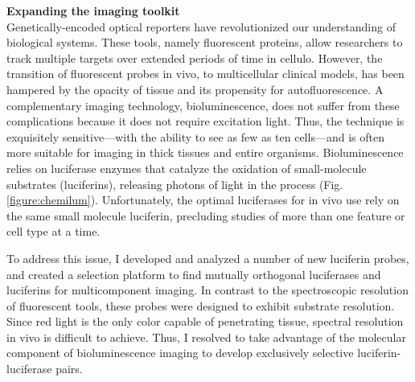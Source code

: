 \documentclass[11pt]{article}
\begin{document}
\textbf{Expanding the imaging toolkit}\\
Genetically-encoded optical reporters have revolutionized our understanding of biological systems. These tools, namely fluorescent proteins, allow researchers to track multiple targets over extended periods of time in cellulo. However, the transition of fluorescent probes in vivo, to multicellular clinical models, has been hampered by the opacity of tissue and its propensity for autofluorescence. A complementary imaging technology, bioluminescence, does not suffer from these complications because it does not require excitation light.
Thus, the technique is exquisitely sensitive—with the ability to see as few as ten cells—and is often more suitable for imaging in thick tissues and entire organisms. Bioluminescence relies on luciferase enzymes that catalyze the oxidation of small-molecule substrates (luciferins), releasing photons of light in the process (Fig. \ref{figure:chemilum}). Unfortunately, the optimal luciferases for in vivo use rely on the same small molecule luciferin, precluding studies of more than one feature or cell type at a time.

To address this issue, I developed and analyzed a number of new luciferin probes, and created a selection platform to find mutually orthogonal luciferases and luciferins for multicomponent imaging. In contrast to the spectroscopic resolution of fluorescent tools, these probes were designed to exhibit substrate resolution. Since red light is the only color capable of penetrating tissue, spectral resolution in vivo is difficult to achieve.
Thus, I resolved to take advantage of the molecular component of bioluminescence imaging to develop exclusively selective luciferin-luciferase pairs.
\end{document}
